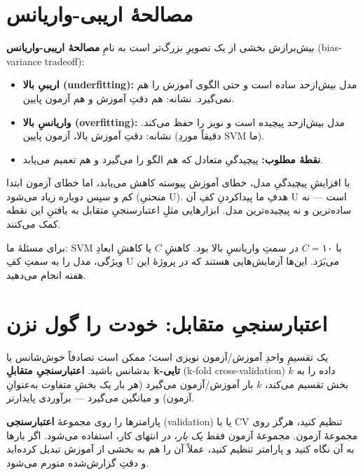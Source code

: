 \documentclass[12pt,a4paper]{article}
\begin{document}
\section{مصالحهٔ اریبی-واریانس}

بیش‌برازش بخشی از یک تصویرِ بزرگ‌تر است به نامِ \textbf{مصالحهٔ اریبی-واریانس} (bias-variance tradeoff):

\begin{itemize}
  \item \textbf{اریبیِ بالا (underfitting):} مدل بیش‌از‌حد ساده است و حتی الگوی آموزش را هم نمی‌گیرد. نشانه: هم دقتِ آموزش و هم آزمون پایین.
  \item \textbf{واریانسِ بالا (overfitting):} مدل بیش‌از‌حد پیچیده است و نویز را حفظ می‌کند. نشانه: دقتِ آموزش بالا، آزمون پایین (دقیقاً موردِ SVMِ ما).
  \item \textbf{نقطهٔ مطلوب:} پیچیدگیِ متعادل که هم الگو را می‌گیرد و هم تعمیم می‌یابد.
\end{itemize}

\begin{riyazi}
با افزایشِ پیچیدگیِ مدل، خطای آموزش پیوسته کاهش می‌یابد، اما خطای آزمون ابتدا کم و سپس دوباره زیاد می‌شود (منحنیِ U). هدفِ ما پیدا‌کردنِ کفِ آن U است — نه ساده‌ترین و نه پیچیده‌ترین مدل. ابزارهایی مثلِ اعتبارسنجیِ متقابل به یافتنِ این نقطه کمک می‌کنند.
\end{riyazi}

\begin{yaddasht}
برای مسئلهٔ ما: SVM با $C=۱۰$ در سمتِ واریانسِ بالا بود. کاهشِ $C$ یا کاهشِ ابعادِ ویژگی، مدل را به سمتِ کفِ U می‌بَرَد. این‌ها آزمایش‌هایی هستند که در پروژهٔ این هفته انجام می‌دهید.
\end{yaddasht}

\section{اعتبارسنجیِ متقابل: خودت را گول نزن}

یک تقسیمِ واحدِ آموزش/آزمون نویزی است؛ ممکن است تصادفاً خوش‌شانس یا بدشانس باشید. \textbf{اعتبارسنجیِ متقابلِ k-تایی} (k-fold cross-validation) داده را به $k$ بخش تقسیم می‌کند، $k$ بار آموزش/آزمون می‌گیرد (هر بار یک بخشِ متفاوت به‌عنوانِ آزمون) و میانگین می‌گیرد — برآوردی پایدارتر.

\begin{hoshdar}
پارامترها را روی مجموعهٔ \textbf{اعتبارسنجی} (validation) یا با CV تنظیم کنید، هرگز روی مجموعهٔ آزمون. مجموعهٔ آزمون فقط \emph{یک بار}، در انتهای کار، استفاده می‌شود. اگر بارها به آن نگاه کنید و پارامتر تنظیم کنید، عملاً آن را هم به بخشی از آموزش تبدیل کرده‌اید و دقتِ گزارش‌شده متورم می‌شود.
\end{hoshdar}
\end{document}
